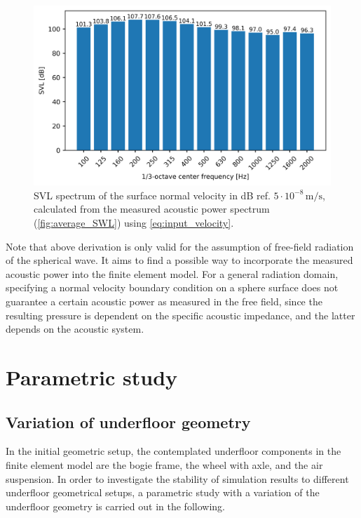 {\begin{figure}
	\centering
	\includegraphics{fig/chap4/input_SVL.png}
	\caption{SVL spectrum of the surface normal velocity in dB ref. $5\cdot10^{-8}\,\text{m/s}$, calculated from the measured acoustic power spectrum (\cref{fig:average_SWL}) using \cref{eq:input_velocity}.}
	\label{fig:input_SVL}
\end{figure}

Note that above derivation is only valid for the assumption of free-field radiation of the spherical wave. It aims to find a possible way to incorporate the measured acoustic power into the finite element model. For a general radiation domain, specifying a normal velocity boundary condition on a sphere surface does not guarantee a certain acoustic power as measured in the free field, since the resulting pressure is dependent on the specific acoustic impedance, and the latter depends on the acoustic system.

\newpage
\section{Parametric study}
\label{section:parametric_study}
\subsection{Variation of underfloor geometry}
\label{section:variation_geometry}

In the initial geometric setup, the contemplated underfloor components in the finite element model are the bogie frame, the wheel with axle, and the air suspension. In order to investigate the stability of simulation results to different underfloor geometrical setups, a parametric study with a variation of the underfloor geometry is carried out in the following.

}
